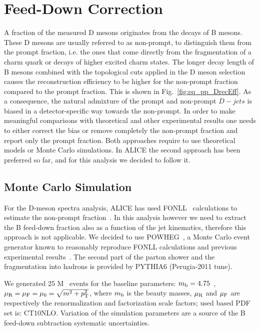 \section{Feed-Down Correction}
\label{sec:FD}

A fraction of the measured D mesons originates from the decays of B mesons. These D mesons are usually referred to as non-prompt,
to distinguish them from the prompt fraction, i.e. the ones that come directly from the fragmentation of a charm quark or decays of higher excited charm states.
The longer decay length of B mesons combined with the topological cuts applied in the D meson selection causes the reconstruction efficiency 
to be higher for the non-prompt fraction compared to the prompt fraction. This is shown in Fig.~\ref{fig:eq_pp_DrecEff}.
As a consequence, the natural admixture of the prompt and non-prompt $D-jets$ is biased in a detector-specific way towards the non-prompt.
In order to make meaningful comparisons with theoretical and other experimental results one needs to either correct the bias or remove completely the non-prompt fraction and report only the prompt fraction. 
Both approaches require to use theoretical models or Monte Carlo simulations.
In ALICE the second approach has been preferred so far, and for this analysis we decided to follow it.

\subsection{Monte Carlo Simulation}

For the D-meson spectra analysis, ALICE has used FONLL~\cite{Cacciari:1998} calculations to estimate the non-prompt fraction~\cite{ALICE:2012d, ALICE:2014d, ALICE:2016a}.
In this analysis however we need to extract the B feed-down fraction also as a function of the jet kinematics, therefore this approach is not applicable.
We decided to use POWHEG~\cite{Alioli:2010}, a Monte Carlo event generator known to reasonably reproduce FONLL calculations and previous experimental results~\cite{Cacciari:2012b}.
The second part of the parton shower and the fragmentation into hadrons is provided by PYTHIA6 (Perugia-2011 tune).

We generated 25 M \bbbar\ events for the baseline parameters: 
$m_{\rm b} = 4.75$~\GeVcsq, $\mu_{\rm R} = \mu_{\rm F} =\mu_{0} = \sqrt{m^2+p_{\rm T}^2}$,
where $m_{\rm b}$ is the beauty masses, $\mu_{\rm R}$ and $\mu_{\rm F}$ are respectively the renormalization and factorization scale factors; used based PDF set is: CT10NLO.
Variation of the simulation parameters are a source of the B feed-down subtraction systematic uncertainties.

